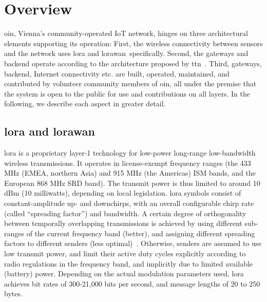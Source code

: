 \section{Overview}\label{sec-overview}

\gls{oin}, Vienna's community-operated \gls{IoT} network, hinges on
three architectural elements supporting its operation:
First, the wireless connectivity between sensors and the network
uses \gls{lora} and \gls{lorawan} specifically.
Second, the gateways and backend operate according to the architecture
proposed by \gls{ttn}~\cite{ttn}.
Third, gateways, backend, Internet connectivity etc. are built, operated,
maintained, and contributed by volunteer community members of \gls{oin},
all under the premise that the system is open to the public for use and
contributions on all layers.
In the following, we describe each aspect in greater detail.


\subsection{\gls{lora} and \gls{lorawan}}

\gls{lora} is a proprietary layer-1 technology for low-power long-range
low-bandwidth wireless transmissions. It operates in license-exempt
frequency ranges (the 433 MHz (EMEA, northern Asia) and 915 MHz
(the Americas) \acrshort{ISM} bands, and the European 868 MHz
\acrshort{SRD} band). The transmit power is thus limited to around
10 dBm (10 milliwatts), depending on local legislation.
\gls{lora} symbols consist of constant-amplitude up- and downchirps,
with an overall configurable chirp rate (called ``spreading factor'')
and bandwidth.
A certain degree of orthogonality between temporally overlapping
transmissions is achieved by using different sub-ranges of
the current frequency band (better), and assigning different spreading
factors to different senders (less optimal)~\cite{croce}.
Otherwise, senders are assumed to use low
transmit power, and limit their active duty cycles explicitly
according to radio regulations in the frequency band, and implicitly
due to limited available (battery) power.
Depending on the actual modulation parameters used, \gls{lora}
achieves bit rates of 300-21,000 bits per second, and message lengths
of 20 to 250 bytes.
%

